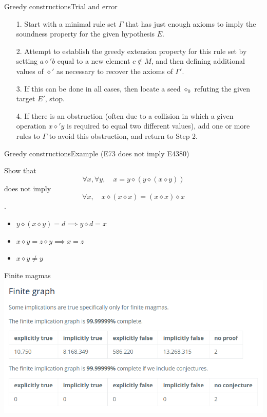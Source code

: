 \documentclass{beamer}
\newcommand{\op}{\diamond}
\begin{document}
\begin{frame}{Greedy constructions}{Trial and error}

\begin{itemize}
	\item[1.] Start with a minimal rule set $\Gamma$ that has just enough axioms to imply the soundness property for the given hypothesis $E$.
	\item[2.] Attempt to establish the greedy extension property for this rule set by setting $a \op' b$ equal to a new element $c \not \in M$, and then defining additional values of $\op'$ as necessary to recover the axioms of $\Gamma'$.
	\item[3.] If this can be done in all cases, then locate a seed $\op_0$ refuting the given target $E'$, stop.
	\item[4.] If there is an obstruction (often due to a collision in which a given operation $x \op' y$ is required to equal two different values), add one or more rules to $\Gamma$ to avoid this obstruction, and return to Step 2.
\end{itemize}

\end{frame}


\begin{frame}{Greedy constructions}{Example (E73 does not imply E4380)}

Show that
$$\forall x, \forall y,\quad x = y \op (y \op (x \op y))$$
does not imply
$$\forall x,\quad x \op (x \op x) = (x \op x) \op x$$
.
\begin{itemize}
	\pause\item $y \op (x \op y) = d \implies y \op d = x$
	\pause\item $x \op y = z \op y \implies x=z$
	\pause\item $x \op y \ne y$
\end{itemize}

\end{frame}


\begin{frame}{Finite magmas}
\includegraphics[width=\textwidth]{finite_status}
\end{frame}
\end{document}
